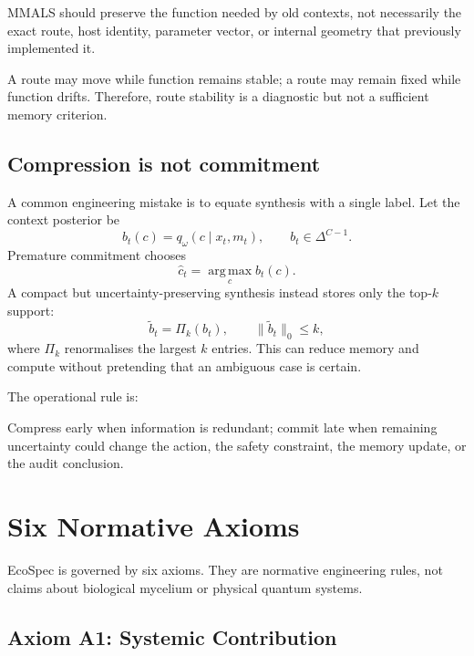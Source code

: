 \documentclass[10pt]{article}
\newcommand{\argmax}{\operatorname*{arg\,max}}
\begin{document}
\begin{principlebox}
MMALS should preserve the function needed by old contexts, not necessarily the exact route, host identity, parameter vector, or internal geometry that previously implemented it.
\end{principlebox}

A route may move while function remains stable; a route may remain fixed while function drifts. Therefore, route stability is a diagnostic but not a sufficient memory criterion.

\subsection{Compression is not commitment}

A common engineering mistake is to equate synthesis with a single label. Let the context posterior be
\begin{equation}
  b_t(c)=q_\omega(c\mid x_t,m_t), \qquad b_t\in\Delta^{C-1}.
\end{equation}
Premature commitment chooses
\begin{equation}
  \hat c_t=\argmax_c b_t(c).
\end{equation}
A compact but uncertainty-preserving synthesis instead stores only the top-$k$ support:
\begin{equation}
  \tilde b_t = \Pi_{k}(b_t), \qquad \|\tilde b_t\|_0\le k,
  \label{eq:topkbelief}
\end{equation}
where $\Pi_k$ renormalises the largest $k$ entries. This can reduce memory and compute without pretending that an ambiguous case is certain.

The operational rule is:

\begin{principlebox}
Compress early when information is redundant; commit late when remaining uncertainty could change the action, the safety constraint, the memory update, or the audit conclusion.
\end{principlebox}

\section{Six Normative Axioms}

EcoSpec is governed by six axioms. They are normative engineering rules, not claims about biological mycelium or physical quantum systems.

\subsection{Axiom A1: Systemic Contribution}
\end{document}

